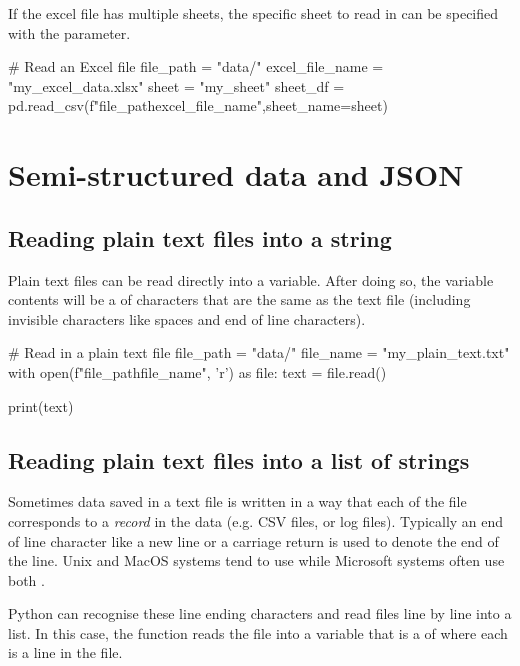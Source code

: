 If the excel file has multiple sheets, the specific sheet to read in can be specified with the  parameter.

\begin{pycode}
    # Read an Excel file
    file_path = "data/"
    excel_file_name = "my_excel_data.xlsx"
    sheet = "my_sheet"
    sheet_df = pd.read_csv(f"{file_path}{excel_file_name}",sheet_name=sheet)
\end{pycode}

\newpage
\section{Semi-structured data and JSON}

\subsection{Reading plain text files into a string}

Plain text files can be read directly into a variable. After doing so, the variable contents will be a  of characters that are the same as the text file (including invisible characters like spaces and end of line characters).

\begin{pycode}
    # Read in a plain text file
    file_path = "data/"
    file_name = "my_plain_text.txt"
    with open(f"{file_path}{file_name}", 'r') as file:
        text = file.read()

    print(text)
\end{pycode}

\subsection{Reading plain text files into a list of strings}

Sometimes data saved in a text file is written in a way that each  of the file corresponds to a \textit{record} in the data (e.g. CSV files, or log files). Typically an end of line character like a new line \code{\n} or a carriage return \code{\r} is used to denote the end of the line. Unix and MacOS systems tend to use \code{\n} while Microsoft systems often use both \code{\n\r}. 

Python can recognise these line ending characters and read files line by line into a list. In this case, the  function reads the file into a variable that is a  of  where each  is a line in the file.

